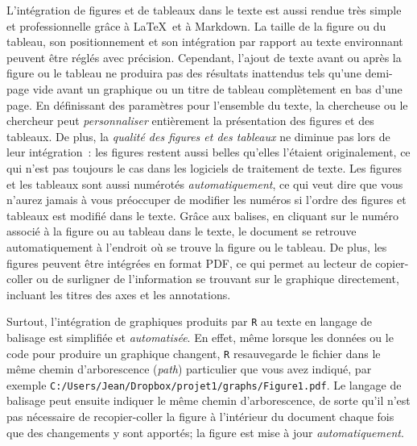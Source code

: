 \documentclass[
  letterpaper,
]{scrbook}
\begin{document}
L'intégration de figures et de tableaux dans le texte est aussi rendue
très simple et professionnelle grâce à \LaTeX~et à Markdown. La taille
de la figure ou du tableau, son positionnement et son intégration par
rapport au texte environnant peuvent être réglés avec précision.
Cependant, l'ajout de texte avant ou après la figure ou le tableau ne
produira pas des résultats inattendus tels qu'une demi-page vide avant
un graphique ou un titre de tableau complètement en bas d'une page. En
définissant des paramètres pour l'ensemble du texte, la chercheuse ou le
chercheur peut \emph{personnaliser} entièrement la présentation des
figures et des tableaux. De plus, la \emph{qualité des figures et des
tableaux} ne diminue pas lors de leur intégration~: les figures restent
aussi belles qu'elles l'étaient originalement, ce qui n'est pas toujours
le cas dans les logiciels de traitement de texte. Les figures et les
tableaux sont aussi numérotés \emph{automatiquement}, ce qui veut dire
que vous n'aurez jamais à vous préoccuper de modifier les numéros si
l'ordre des figures et tableaux est modifié dans le texte. Grâce aux
balises, en cliquant sur le numéro associé à la figure ou au tableau
dans le texte, le document se retrouve automatiquement à l'endroit où se
trouve la figure ou le tableau. De plus, les figures peuvent être
intégrées en format PDF, ce qui permet au lecteur de copier-coller ou de
surligner de l'information se trouvant sur le graphique directement,
incluant les titres des axes et les annotations.

Surtout, l'intégration de graphiques produits par \texttt{R} au texte en
langage de balisage est simplifiée et \emph{automatisée}. En effet, même
lorsque les données ou le code pour produire un graphique changent,
\texttt{R} resauvegarde le fichier dans le même chemin d'arborescence
(\emph{path}) particulier que vous avez indiqué, par exemple
\texttt{C:/Users/Jean/Dropbox/projet1/graphs/Figure1.pdf}. Le langage de
balisage peut ensuite indiquer le même chemin d'arborescence, de sorte
qu'il n'est pas nécessaire de recopier-coller la figure à l'intérieur du
document chaque fois que des changements y sont apportés; la figure est
mise à jour \emph{automatiquement}.
\end{document}
